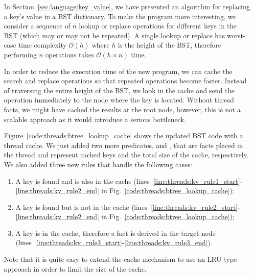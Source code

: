 In Section~\ref{sec:language:key_value}, we have presented an algorithm for
replacing a key's value in a BST dictionary. To make the program more
interesting, we consider a sequence of $n$ lookup or replace operations for
different keys in the BST (which may or may not be repeated). A single lookup or
replace has worst-case time complexity $\mathcal{O}(h)$ where $h$ is the height
of the BST, therefore performing $n$ operations takes $\mathcal{O}(h \times n)$
time.

In order to reduce the execution time of the new program, we can cache the
search and replace operations so that repeated operations become faster. Instead
of traversing the entire height of the BST, we look in the cache and send the
operation immediately to the node where the key is located. Without thread
facts, we might have cached the results at the root node, however, this is not a
scalable approach as it would introduce a serious bottleneck.

Figure~\ref{code:threads:btree_lookup_cache} shows the updated BST code with a thread
cache. We just added two more predicates,  and
, that are facts placed in the thread and represent cached
keys and the total size of the cache, respectively. We also added three new
rules that handle the following cases:

\begin{enumerate}
      \item A key is found and is also in the cache
         (lines~\ref{line:threads:kv_rule1_start}-\ref{line:threads:kv_rule2_end}
         in Fig.~\ref{code:threads:btree_lookup_cache});

      \item A key is found but is not in the cache
         (lines~\ref{line:threads:kv_rule2_start}-\ref{line:threads:kv_rule2_end}
         in Fig.~\ref{code:threads:btree_lookup_cache});

      \item A key is in the cache, therefore a  fact is
         derived in the target node
         (lines~\ref{line:threads:kv_rule3_start}-\ref{line:threads:kv_rule3_end}).

\end{enumerate}

Note that it is quite easy to extend the cache mechanism to use an LRU type
approach in order to limit the size of the cache.

